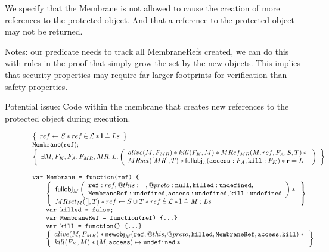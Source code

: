 \documentclass[a4paper,notitlepage]{report}
\begin{document}
We specify that the Membrane is not allowed to cause the creation of more
references to the protected object. And that a reference to the protected object
may not be returned.

Notes: our predicate needs to track all MembraneRefs created, we can do this
with rules in the proof that simply grow the set by the new objects.
This implies that security properties may require far larger footprints for
verification than safety properties.

Potential issue: Code within the membrane that creates new references to the
protected object during execution.

\begin{figure}[b]
  \[
    \begin{array}{l}
      \logic{
        ref \bp S \sep ref \dotin \loc \sep \ls \doteq Ls
      } \\
      \js{Membrane(ref);} \\
      \logic{
        \exists M, F_K, F_A, F_{MR}, MR, L \st \args{
          alive(M, F_{MR}) \sep
          kill(F_K,M) \sep
          MRef_{MR}(M, ref, F_A, S, T) \sep {} \\
          MRset([MR],T) \sep
          \fullobj_L(\js{access}:F_A,\js{kill}:F_K) \sep
          \rv \doteq L
        }
      } \\
      \\
      \tjs{var Membrane = function(ref) \{} \\
        \indblock{
          \logic{
            \fullobj_M \args{
              \js{ref}: ref, @this: \_, @proto: \nil, \js{killed}: \und, \\
              \js{MembraneRef}: \und, \js{access}: \und, \js{kill}: \und
            } \sep {} \\
            MRset_M([], T) \sep
            ref \bp S \cup T \sep
            ref \dotin \loc \sep
            \ls \doteq M:Ls
          } \\
          \tjs{var killed = false;} \\
          \tjs{var MembraneRef = function(ref) \{...\}} \\
          \tjs{var kill = function() \{...\}} \\
          \logic{
            alive(M, F_{MR}) \sep
            \newobj_M(\js{ref},@this,@proto,\js{killed},\js{MembraneRef},
                   \js{access},\js{kill}) \sep {} \\

            kill(F_K,M) \sep
            (M,\js{access}) \pointsto \und \sep {} \\

}}
\end{array}\]
\end{figure}
\end{document}
